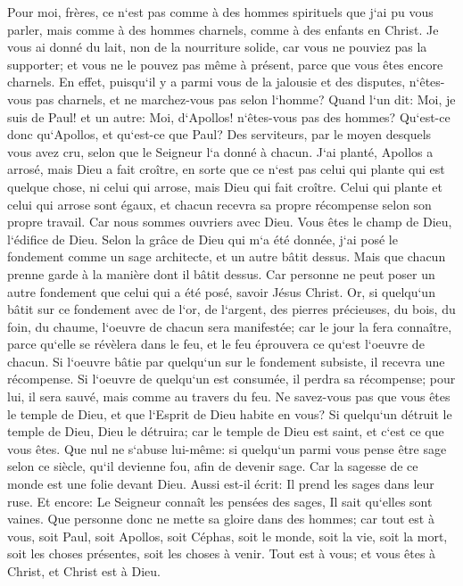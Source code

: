 \verse Pour moi, frères, ce n`est pas comme à des hommes spirituels que j`ai pu vous parler, mais comme à des hommes charnels, comme à des enfants en Christ. 
\verse Je vous ai donné du lait, non de la nourriture solide, car vous ne pouviez pas la supporter; et vous ne le pouvez pas même à présent, parce que vous êtes encore charnels. 
\verse En effet, puisqu`il y a parmi vous de la jalousie et des disputes, n`êtes-vous pas charnels, et ne marchez-vous pas selon l`homme? 
\verse Quand l`un dit: Moi, je suis de Paul! et un autre: Moi, d`Apollos! n`êtes-vous pas des hommes? 
\verse Qu`est-ce donc qu`Apollos, et qu`est-ce que Paul? Des serviteurs, par le moyen desquels vous avez cru, selon que le Seigneur l`a donné à chacun. 
\verse J`ai planté, Apollos a arrosé, mais Dieu a fait croître, 
\verse en sorte que ce n`est pas celui qui plante qui est quelque chose, ni celui qui arrose, mais Dieu qui fait croître. 
\verse Celui qui plante et celui qui arrose sont égaux, et chacun recevra sa propre récompense selon son propre travail. 
\verse Car nous sommes ouvriers avec Dieu. Vous êtes le champ de Dieu, l`édifice de Dieu. 
\verse Selon la grâce de Dieu qui m`a été donnée, j`ai posé le fondement comme un sage architecte, et un autre bâtit dessus. Mais que chacun prenne garde à la manière dont il bâtit dessus. 
\verse Car personne ne peut poser un autre fondement que celui qui a été posé, savoir Jésus Christ. 
\verse Or, si quelqu`un bâtit sur ce fondement avec de l`or, de l`argent, des pierres précieuses, du bois, du foin, du chaume, l`oeuvre de chacun sera manifestée; 
\verse car le jour la fera connaître, parce qu`elle se révèlera dans le feu, et le feu éprouvera ce qu`est l`oeuvre de chacun. 
\verse Si l`oeuvre bâtie par quelqu`un sur le fondement subsiste, il recevra une récompense. 
\verse Si l`oeuvre de quelqu`un est consumée, il perdra sa récompense; pour lui, il sera sauvé, mais comme au travers du feu. 
\verse Ne savez-vous pas que vous êtes le temple de Dieu, et que l`Esprit de Dieu habite en vous? 
\verse Si quelqu`un détruit le temple de Dieu, Dieu le détruira; car le temple de Dieu est saint, et c`est ce que vous êtes. 
\verse Que nul ne s`abuse lui-même: si quelqu`un parmi vous pense être sage selon ce siècle, qu`il devienne fou, afin de devenir sage. 
\verse Car la sagesse de ce monde est une folie devant Dieu. Aussi est-il écrit: Il prend les sages dans leur ruse. 
\verse Et encore: Le Seigneur connaît les pensées des sages, Il sait qu`elles sont vaines. 
\verse Que personne donc ne mette sa gloire dans des hommes; car tout est à vous, 
\verse soit Paul, soit Apollos, soit Céphas, soit le monde, soit la vie, soit la mort, soit les choses présentes, soit les choses à venir. 
\verse Tout est à vous; et vous êtes à Christ, et Christ est à Dieu. 


